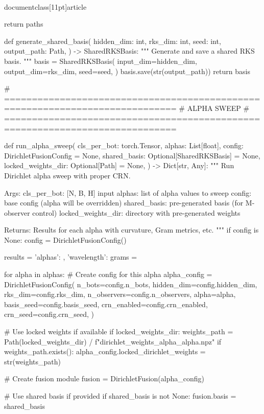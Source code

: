 \\documentclass[11pt]{article}
\begin{document}
\begin{CodeBlock}
{{{{{{{{    return paths


def generate_shared_basis(
    hidden_dim: int,
    rks_dim: int,
    seed: int,
    output_path: Path,
) -> SharedRKSBasis:
    """
    Generate and save a shared RKS basis.
    """
    basis = SharedRKSBasis(
        input_dim=hidden_dim,
        output_dim=rks_dim,
        seed=seed,
    )
    basis.save(str(output_path))
    return basis


# =============================================================================
# ALPHA SWEEP
# =============================================================================

def run_alpha_sweep(
    cls_per_bot: torch.Tensor,
    alphas: List[float],
    config: DirichletFusionConfig = None,
    shared_basis: Optional[SharedRKSBasis] = None,
    locked_weights_dir: Optional[Path] = None,
) -> Dict[str, Any]:
    """
    Run Dirichlet alpha sweep with proper CRN.
    
    Args:
        cls_per_bot: [N, B, H] input
        alphas: list of alpha values to sweep
        config: base config (alpha will be overridden)
        shared_basis: pre-generated basis (for M-observer control)
        locked_weights_dir: directory with pre-generated weights
        
    Returns:
        Results for each alpha with curvature, Gram metrics, etc.
    """
    if config is None:
        config = DirichletFusionConfig()
    
    results = {'alphas': {}, 'wavelength': {}}
    grams = {}
    
    for alpha in alphas:
        # Create config for this alpha
        alpha_config = DirichletFusionConfig(
            n_bots=config.n_bots,
            hidden_dim=config.hidden_dim,
            rks_dim=config.rks_dim,
            n_observers=config.n_observers,
            alpha=alpha,
            basis_seed=config.basis_seed,
            crn_enabled=config.crn_enabled,
            crn_seed=config.crn_seed,
        )
        
        # Use locked weights if available
        if locked_weights_dir:
            weights_path = Path(locked_weights_dir) / f"dirichlet_weights_alpha_{alpha}.npz"
            if weights_path.exists():
                alpha_config.locked_dirichlet_weights = str(weights_path)
        
        # Create fusion module
        fusion = DirichletFusion(alpha_config)
        
        # Use shared basis if provided
        if shared_basis is not None:
            fusion.basis = shared_basis
        
}}}}}}}}
\end{CodeBlock}
\end{document}
